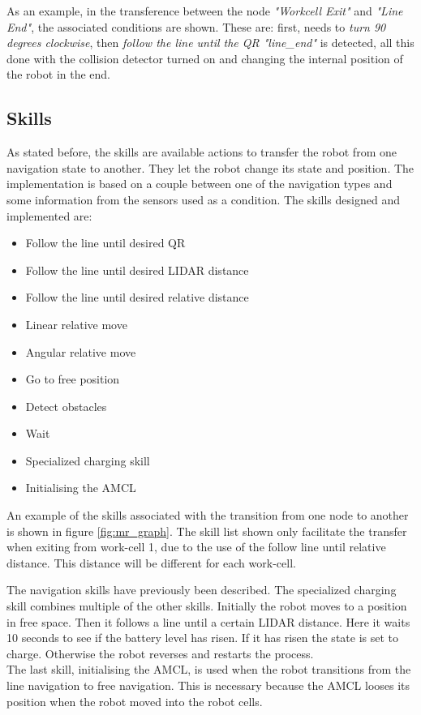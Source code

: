     As an example, in the transference between the node \emph{"Workcell Exit"} and \emph{"Line End"}, the associated conditions are shown. 
    These are: first, needs to \emph{turn 90 degrees clockwise}, then \emph{follow the line until the QR "line\_end"} is detected, all this done with the collision detector turned on and changing the internal position of the robot in the end.

    \subsection{Skills} %
    \label{sub:skills}
    As stated before, the skills are available actions to transfer the robot from one navigation state to another. They let the robot change its state and position.
    The implementation is based on a couple between one of the navigation types and some information from the sensors used as a condition.
    The skills designed and implemented are:
    \begin{itemize}
        \item Follow the line until desired QR
        \item Follow the line until desired LIDAR distance
        \item Follow the line until desired relative distance
        \item Linear relative move
        \item Angular relative move
        \item Go to free position
        \item Detect obstacles
        \item Wait
        \item Specialized charging skill
        \item Initialising the AMCL 
    \end{itemize}    
	An example of the skills associated with the transition from one node to another is shown in figure \ref{fig:mr_graph}. The skill list shown only facilitate the transfer when exiting from work-cell 1, due to the use of the follow line until relative distance. This distance will be different for each work-cell.

The navigation skills have previously been described. The specialized charging skill combines multiple of the other skills. Initially the robot moves to a position in free space. Then it follows a line until a certain LIDAR distance. Here it waits 10 seconds to see if the battery level has risen. If it has risen the state is set to charge. Otherwise the robot reverses and restarts the process. \\
The last skill, initialising the AMCL, is used when the robot transitions from the line navigation to free navigation. This is necessary because the AMCL looses its position when the robot moved into the robot cells.
	
